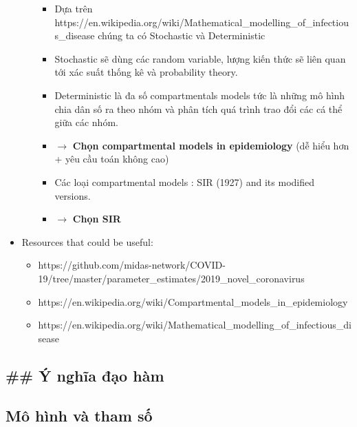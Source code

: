 \documentclass[11pt]{article}
\providecommand{\tightlist}{%
      \setlength{\itemsep}{0pt}\setlength{\parskip}{0pt}}
\begin{document}
\begin{itemize}
\begin{itemize}
    \begin{itemize}
    \tightlist
    \item
      Dựa trên
      https://en.wikipedia.org/wiki/Mathematical\_modelling\_of\_infectious\_disease
      chúng ta có Stochastic và Deterministic
    \item
      Stochastic sẽ dùng các random variable, lượng kiến thức sẽ liên
      quan tới xác suất thống kê và probability theory.
    \item
      Deterministic là đa số compartmentals models tức là những mô hình
      chia dân số ra theo nhóm và phân tích quá trình trao đổi các cá
      thể giữa các nhóm.
    \item
      \(\rightarrow\) \textbf{Chọn compartmental models in epidemiology}
      (dễ hiểu hơn + yêu cầu toán không cao)
    \item
      Các loại compartmental models : SIR (1927) and its modified
      versions.
    \item
      \(\rightarrow\) \textbf{Chọn SIR}
    \end{itemize}
  \end{itemize}
\item
  Resources that could be useful:

  \begin{itemize}
  \tightlist
  \item
    https://github.com/midas-network/COVID-19/tree/master/parameter\_estimates/2019\_novel\_coronavirus
  \item
    https://en.wikipedia.org/wiki/Compartmental\_models\_in\_epidemiology
  \item
    https://en.wikipedia.org/wiki/Mathematical\_modelling\_of\_infectious\_disease
  \end{itemize}
\end{itemize}

\subsection{\#\# Ý nghĩa đạo hàm}\label{y-nghia-ux111ao-ham}

\subsection{Mô hình và tham số}\label{muxf4-hinh-va-tham-suxf4}
\end{document}
